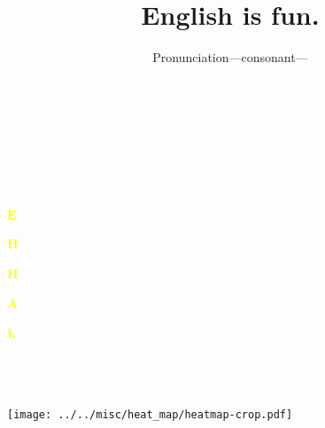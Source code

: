 \documentclass[aspectratio=169,xcolor={dvipsnames,table}]{beamer}
\title{English is fun.}
\subtitle{Pronunciation---consonant---}
\author{}
\institute[]{}
\date[]
\makeatletter
\newcommand*{\themonth}{\two@digits\month}
\newcommand*{\theday}{\two@digits\day}
\newcommand{\mytoday}{{\the\year}--{\themonth}--{\theday}}
\makeatother
\begin{document}
\begin{frame}
\raggedleft
  \textcolor{white}{\Huge\bfseries English is fun.}

\vfill

\raggedleft
 \textcolor{white}{\LARGE\bfseries \mytoday}

\vfill
\vfill
\vfill

\raggedleft
\textcolor{white}{\large The lesson will begin at the scheduled time.}

\end{frame}

\begin{frame}
\raggedleft
  \textcolor{white}{\Huge\bfseries \textcolor{yellow}{E}nglish is fun.}

\vfill

\vfill

\raggedleft
 \textcolor{white}{\LARGE\bfseries \textcolor{yellow}{H}ello, everybody!}

 \textcolor{white}{\LARGE\bfseries \textcolor{yellow}{H}ow are you today?}

\raggedleft
 \textcolor{white}{\LARGE\bfseries \textcolor{yellow}{A}re you ready to start?}

 \textcolor{white}{\LARGE\bfseries \textcolor{yellow}{L}et's begin today's lesson.}

\vfill

\raggedleft
 \textcolor{white}{\Large \bfseries \mytoday}

\hyperlink{today}{}

\pause
\textcolor{white}{$20250919=13\times{}1,557,763$}
\end{frame}
\begin{frame}[plain]

\hspace*{-22pt}
\texttt{[image: ../../misc/heat\_map/heatmap-crop.pdf]}
\end{frame}
\end{document}
